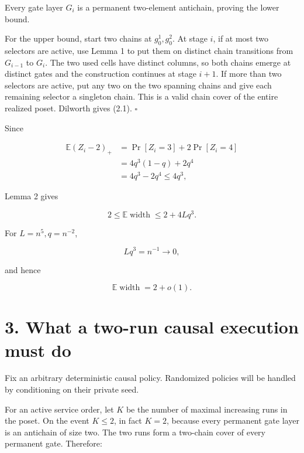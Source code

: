 \documentclass[11pt,a4paper]{article}
\begin{document}
Every gate layer \(G_i\) is a permanent two-element antichain, proving the lower bound.


For the upper bound, start two chains at \(g_0^1,g_0^2\).  At stage \(i\), if at most two selectors are active, use Lemma 1 to put them on distinct chain transitions from \(G_{i-1}\) to \(G_i\).  The two used cells have distinct columns, so both chains emerge at distinct gates and the construction continues at stage \(i+1\).  If more than two selectors are active, put any two on the two spanning chains and give each remaining selector a singleton chain.  This is a valid chain cover of the entire realized poset.  Dilworth gives (2.1). \(\square\)


Since


\begin{equation}
\begin{aligned}
\mathbb E(Z_i-2)_+
 &=\Pr[Z_i=3]+2\Pr[Z_i=4]\\
 &=4q^3(1-q)+2q^4\\
 &=4q^3-2q^4
 \le4q^3,
\end{aligned}
\tag{2.2}
\end{equation}

Lemma 2 gives


\begin{equation}
 2\le\mathbb E\operatorname{width}
      \le2+4Lq^3.
\tag{2.3}
\end{equation}

For \(L=n^5,q=n^{-2}\),


\[
                         Lq^3=n^{-1}\longrightarrow0,
\]

and hence


\begin{equation}
                         \mathbb E\operatorname{width}
                                  =2+o(1).
\tag{2.4}
\end{equation}

\section*{3. What a two-run causal execution must do}

Fix an arbitrary deterministic causal policy.  Randomized policies will be handled by conditioning on their private seed.


For an active service order, let \(K\) be the number of maximal increasing runs in the poset.  On the event \(K\le2\), in fact \(K=2\), because every permanent gate layer is an antichain of size two.  The two runs form a two-chain cover of every permanent gate.  Therefore:
\end{document}
